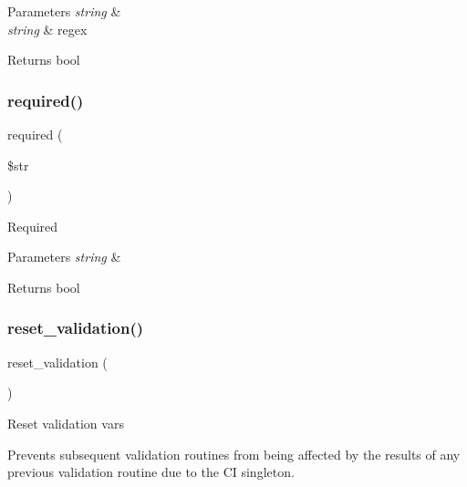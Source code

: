 \begin{DoxyParams}{Parameters}
{\em string} & \\
\hline
{\em string} & regex \\
\hline
\end{DoxyParams}
\begin{DoxyReturn}{Returns}
bool 
\end{DoxyReturn}
\mbox{\label{class_c_i___form__validation_ada72eadfd041118d5f429a93dd0de07e}} 
\subsubsection{\texorpdfstring{required()}{required()}}
{\footnotesize\ttfamily required (\begin{DoxyParamCaption}\item[{}]{\$str }\end{DoxyParamCaption})}

Required


\begin{DoxyParams}{Parameters}
{\em string} & \\
\hline
\end{DoxyParams}
\begin{DoxyReturn}{Returns}
bool 
\end{DoxyReturn}
\mbox{\label{class_c_i___form__validation_a84b8bd64032f6be532968015cba11361}} 
\subsubsection{\texorpdfstring{reset\+\_\+validation()}{reset\_validation()}}
{\footnotesize\ttfamily reset\+\_\+validation (\begin{DoxyParamCaption}{ }\end{DoxyParamCaption})}

Reset validation vars

Prevents subsequent validation routines from being affected by the results of any previous validation routine due to the CI singleton.

